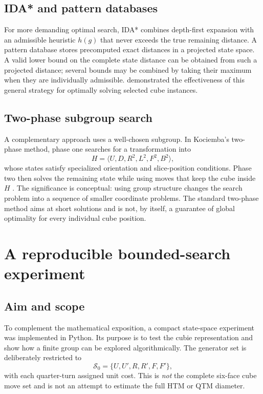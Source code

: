 \documentclass[11pt,a4paper]{article}
\theoremstyle{definition}
\theoremstyle{remark}
\newcommand{\moves}{\mathcal{S}}
\begin{document}
\subsection{IDA* and pattern databases}
For more demanding optimal search, IDA* combines depth-first expansion with an admissible heuristic $h(g)$ that never exceeds the true remaining distance. A pattern database stores precomputed exact distances in a projected state space. A valid lower bound on the complete state distance can be obtained from such a projected distance; several bounds may be combined by taking their maximum when they are individually admissible. \citet{korf1997} demonstrated the effectiveness of this general strategy for optimally solving selected cube instances.

\subsection{Two-phase subgroup search}
A complementary approach uses a well-chosen subgroup. In Kociemba's two-phase method, phase one searches for a transformation into
\begin{equation}\label{eq:phasegroup}
H=\langle U,D,R^2,L^2,F^2,B^2\rangle,
\end{equation}
whose states satisfy specialized orientation and slice-position conditions. Phase two then solves the remaining state while using moves that keep the cube inside $H$ \citep{kociemba2phase}. The significance is conceptual: using group structure changes the search problem into a sequence of smaller coordinate problems. The standard two-phase method aims at short solutions and is not, by itself, a guarantee of global optimality for every individual cube position.

\section{A reproducible bounded-search experiment}\label{sec:experiment}
\subsection{Aim and scope}
To complement the mathematical exposition, a compact state-space experiment was implemented in Python. Its purpose is to test the cubie representation and show how a finite group can be explored algorithmically. The generator set is deliberately restricted to
\begin{equation}
\moves_0=\{U,U',R,R',F,F'\},
\end{equation}
with each quarter-turn assigned unit cost. This is \emph{not} the complete six-face cube move set and is not an attempt to estimate the full HTM or QTM diameter.
\end{document}
